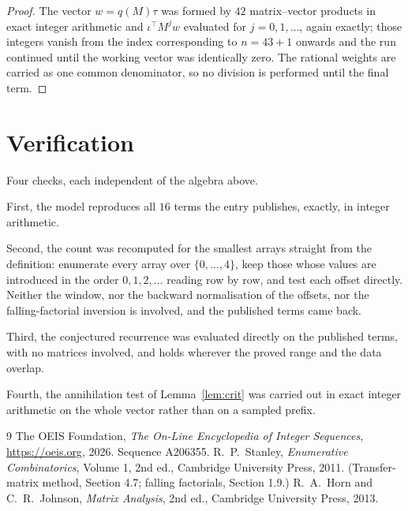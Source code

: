 \documentclass[11pt,a4paper]{article}
\theoremstyle{plain}
\theoremstyle{definition}
\begin{document}
\begin{proof}
The vector $w=q(M)\tau$ was formed by $42$ matrix--vector products in exact integer
arithmetic and $\iota^{\!\top}M^{j}w$ evaluated for $j=0,1,\dots$, again exactly; those
integers vanish from the index corresponding to $n=43+1$ onwards and the run continued
until the working vector was identically zero. The rational weights are carried as one common
denominator, so no division is performed until the final term.
\end{proof}

\section{Verification}

Four checks, each independent of the algebra above.

First, the model reproduces all $16$ terms the entry publishes, exactly, in integer
arithmetic.

Second, the count was recomputed for the smallest arrays straight from the definition:
enumerate every array over $\{0,\dots,4\}$, keep those whose values are introduced in the
order $0,1,2,\dots$ reading row by row, and test each offset directly. Neither the window, nor
the backward normalisation of the offsets, nor the falling-factorial inversion is involved, and
the published terms came back.

Third, the conjectured recurrence was evaluated directly on the published terms, with no
matrices involved, and holds wherever the proved range and the data overlap.

Fourth, the annihilation test of Lemma~\ref{lem:crit} was carried out in exact integer
arithmetic on the whole vector rather than on a sampled prefix.

\begin{thebibliography}{9}
 The OEIS Foundation, \emph{The On-Line Encyclopedia of Integer
Sequences}, \url{https://oeis.org}, 2026. Sequence A206355.
 R.~P.~Stanley, \emph{Enumerative Combinatorics}, Volume 1, 2nd ed.,
Cambridge University Press, 2011. (Transfer-matrix method, Section 4.7; falling factorials,
Section 1.9.)
 R.~A.~Horn and C.~R.~Johnson, \emph{Matrix Analysis}, 2nd ed., Cambridge
University Press, 2013.
\end{thebibliography}
\end{document}
